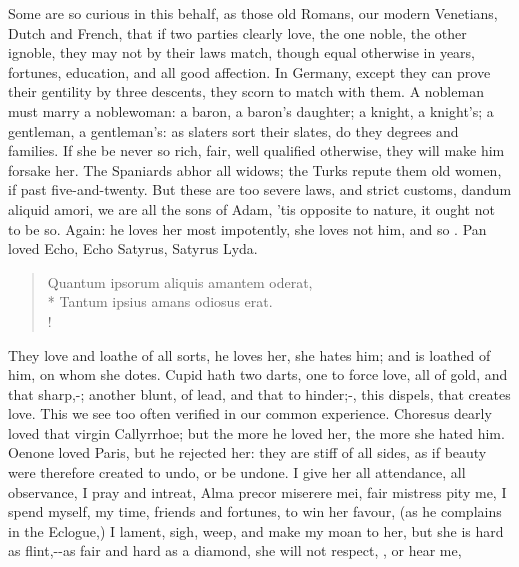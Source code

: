 Some are so curious in this behalf, as those old Romans, our modern
Venetians, Dutch and French, that if two parties clearly love, the one
noble, the other ignoble, they may not by their laws match, though
equal otherwise in years, fortunes, education, and all good affection.
In Germany, except they can prove their gentility by three descents,
they scorn to match with them. A nobleman must marry a noblewoman: a
baron, a baron's daughter; a knight, a knight's; a gentleman, a
gentleman's: as slaters sort their slates, do they degrees and
families. If she be never so rich, fair, well qualified otherwise, they
will make him forsake her. The Spaniards abhor all widows; the Turks
repute them old women, if past five-and-twenty. But these are too
severe laws, and strict customs, dandum aliquid amori, we are all the
sons of Adam, 'tis opposite to nature, it ought not to be so. Again: he
loves her most impotently, she loves not him, and so .
Pan loved Echo, Echo Satyrus, Satyrus Lyda.
%
\begin{latin}%
\begin{verse}%
Quantum ipsorum aliquis amantem oderat,\\*
Tantum ipsius amans odiosus erat.\\!
\end{verse}%
\end{latin}%

They love and loathe of all sorts, he loves her, she hates him; and is
loathed of him, on whom she dotes. Cupid hath two darts, one to force
love, all of gold, and that sharp,-;
another blunt, of lead, and that to hinder;-, this dispels, that creates love. This we see too often verified
in our common experience. Choresus dearly loved that virgin
Callyrrhoe; but the more he loved her, the more she hated him. Oenone
loved Paris, but he rejected her: they are stiff of all sides, as if
beauty were therefore created to undo, or be undone. I give her all
attendance, all observance, I pray and intreat, Alma precor
miserere mei, fair mistress pity me, I spend myself, my time, friends
and fortunes, to win her favour, (as he complains in the
Eclogue,) I lament, sigh, weep, and make my moan to her, but she
is hard as flint,--as fair and hard as a
diamond, she will not respect, , or hear me,

